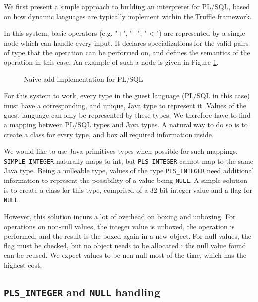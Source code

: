 \documentclass[twoside,11pt,a4paper]{article}
\newcommand{\java}[1]{\textsf{#1}}
\newcommand{\pls}[1]{\small\texttt{#1}\normalsize}
\newcommand{\plstype}[1]{\pls{#1}}
\newcommand{\plsi}{\plstype{PLS\_INTEGER}}
\newcommand{\simpleint}{\plstype{SIMPLE\_INTEGER}}
\newcommand{\plsnull}{\pls{NULL}}
\begin{document}
We first present a simple approach to building an interpreter for PL/SQL, based on how dynamic languages are typically implement within the Truffle framework.

In this system, basic operators (e.g. "$+$", "$-$", "$<$") are represented by a single node which can handle every input. It declares specializations for the valid pairs of type that the operation can be performed on, and defines the semantics of the operation in this case. An example of such a node is given in Figure \ref{fig:naiveadd}.

\begin{figure}[t]
	
	\caption{Naive add implementation for PL/SQL}
	\label{fig:naiveadd}
\end{figure}

For this system to work, every type in the guest language (PL/SQL in this case) must have a corresponding, and unique, Java type to represent it. Values of the guest language can only be represented by these types. We therefore have to find a mapping between PL/SQL types and Java types. A natural way to do so is to create a class for every type, and box all required information inside.

We would like to use Java primitives types when possible for such mappings. \simpleint{} naturally maps to \java{int}, but \plsi{} cannot map to the same Java type. Being a nulleable type, values of the type \plsi{} need additional information to represent the possibility of a value being \plsnull{}. A simple solution is to create a class for this type, comprised of a 32-bit integer value and a flag for \plsnull{}.

However, this solution incurs a lot of overhead on boxing and unboxing. For operations on non-null values, the integer value is unboxed, the operation is performed, and the result is the boxed again in a new object. For null values, the flag must be checked, but no object needs to be allocated : the null value found can be reused. We expect values to be non-null most of the time, which has the highest cost.

\subsection{\plsi{} and \plsnull{} handling}
\end{document}
